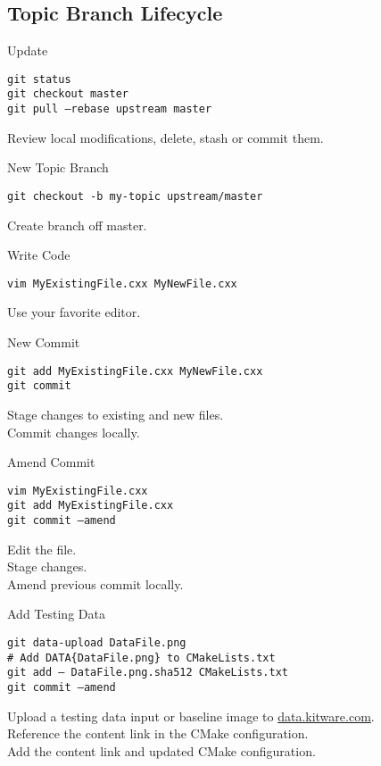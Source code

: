 \documentclass[10pt]{article}
\newlength{\cvsep}
\newlength{\cvtitles}
\newlength{\cvmain}
\newenvironment{category}[1]
  {\parbox[t]{\cvtitles}{\large\sc\centering #1}\hspace*{\cvsep}\begin{minipage}[t]{\cvmain}}
  {\end{minipage}\vspace*{0.35cm}}
\begin{document}
\subsection*{Topic Branch Lifecycle}
\begin{category}{Update}
\parbox[t]{0.6\cvmain}{%
  \texttt{git status\\ git checkout master\\ git pull --rebase upstream master}
}
\parbox[t]{0.38\cvmain}{%
Review local modifications, delete, stash or commit them.
}
\end{category}
\begin{category}{New Topic Branch}
\parbox[t]{0.6\cvmain}{%
  \texttt{git checkout -b my-topic upstream/master}
}
\parbox[t]{0.38\cvmain}{%
Create branch off master.
}
\end{category}
\begin{category}{Write Code}
\parbox[t]{0.6\cvmain}{%
  \texttt{vim MyExistingFile.cxx MyNewFile.cxx}
}
\parbox[t]{0.38\cvmain}{%
Use your favorite editor.
}
\end{category}
\begin{category}{New Commit}
\parbox[t]{0.6\cvmain}{%
  \texttt{git add MyExistingFile.cxx MyNewFile.cxx\\
  git commit}
}
\parbox[t]{0.38\cvmain}{%
Stage changes to existing and new files.\\
Commit changes locally.
}
\end{category}
\begin{category}{Amend Commit}
\parbox[t]{0.6\cvmain}{%
  \texttt{vim MyExistingFile.cxx\\
  git add MyExistingFile.cxx\\
  git commit --amend}
}
\parbox[t]{0.38\cvmain}{%
Edit the file.\\
Stage changes.\\
Amend previous commit locally.
}
\end{category}
\begin{category}{Add Testing Data}
\parbox[t]{0.6\cvmain}{%
  \texttt{git data-upload DataFile.png\\
  \# Add DATA\{DataFile.png\} to CMakeLists.txt\\
  git add -- DataFile.png.sha512 CMakeLists.txt\\
  git commit --amend}
}
\parbox[t]{0.38\cvmain}{%
Upload a testing data input or baseline image to
  \href{https://data.kitware.com}{data.kitware.com}.\\
  Reference the content link in the CMake configuration.\\
  Add the content link and updated CMake configuration.
}
\end{category}
\end{document}
